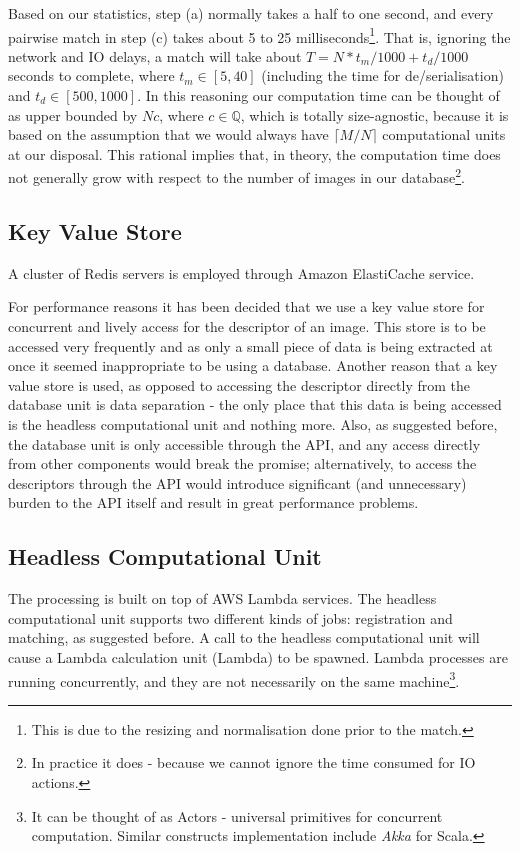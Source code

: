 Based on our statistics, step (a) normally takes a half to one second, and every pairwise match in step (c) takes about 5 to 25 milliseconds\footnote{This is due to the resizing and normalisation done prior to the match.}. That is, ignoring the network and IO delays, a match will take about $T = N * t_m / 1000 + t_d / 1000$ seconds to complete, where $t_m \in [5, 40]$ (including the time for de/serialisation) and $t_d \in [500, 1000]$. In this reasoning our computation time can be thought of as upper bounded by $Nc$, where $c \in \mathbb{Q}$, which is totally size-agnostic, because it is based on the assumption that we would always have $\lceil M / N \rceil$ computational units at our disposal. This rational implies that, in theory, the computation time does not generally grow with respect to the number of images in our database\footnote{In practice it does - because we cannot ignore the time consumed for IO actions.}.

\subsection{Key Value Store}
A cluster of Redis servers is employed through Amazon ElastiCache service. 

For performance reasons it has been decided that we use a key value store for concurrent and lively access for the descriptor of an image. This store is to be accessed very frequently and as only a small piece of data is being extracted at once it seemed inappropriate to be using a database. Another reason that a key value store is used, as opposed to accessing the descriptor directly from the database unit is data separation - the only place that this data is being accessed is the headless computational unit and nothing more. Also, as suggested before, the database unit is only accessible through the API, and any access directly from other components would break the promise; alternatively, to access the descriptors through the API would introduce significant (and unnecessary) burden to the API itself and result in great performance problems.

\subsection{Headless Computational Unit}
\label{sec:lambda}
The processing is built on top of AWS Lambda services. The headless computational unit supports two different kinds of jobs: registration and matching, as suggested before. A call to the headless computational unit will cause a Lambda calculation unit (Lambda) to be spawned. Lambda processes are running concurrently, and they are not necessarily on the same machine\footnote{It can be thought of as Actors - universal primitives for concurrent computation. Similar constructs implementation include \textit{Akka} for Scala.}.

